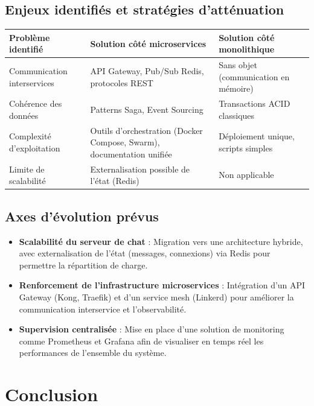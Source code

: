 \documentclass{rapportPfe}
\begin{document}
\subsection{Enjeux identifiés et stratégies d’atténuation}

\begin{center}
\begin{tabular}{|p{4.5cm}|p{5cm}|p{5cm}|}
\hline
\textbf{Problème identifié} & \textbf{Solution côté microservices} & \textbf{Solution côté monolithique} \\
\hline
Communication interservices & API Gateway, Pub/Sub Redis, protocoles REST & Sans objet (communication en mémoire) \\
\hline
Cohérence des données & Patterns Saga, Event Sourcing & Transactions ACID classiques \\
\hline
Complexité d’exploitation & Outils d’orchestration (Docker Compose, Swarm), documentation unifiée & Déploiement unique, scripts simples \\
\hline
Limite de scalabilité & Externalisation possible de l’état (Redis) & Non applicable \\
\hline
\end{tabular}
\end{center}

\newpage

\subsection{Axes d’évolution prévus}

\begin{itemize}
    \item \textbf{Scalabilité du serveur de chat} : Migration vers une architecture hybride, avec externalisation de l’état (messages, connexions) via Redis pour permettre la répartition de charge.
    
    \item \textbf{Renforcement de l'infrastructure microservices} : Intégration d’un API Gateway (Kong, Traefik) et d’un service mesh (Linkerd) pour améliorer la communication interservice et l'observabilité.
    
    \item \textbf{Supervision centralisée} : Mise en place d’une solution de monitoring comme Prometheus et Grafana afin de visualiser en temps réel les performances de l’ensemble du système.
\end{itemize}

\section*{Conclusion}
\end{document}
